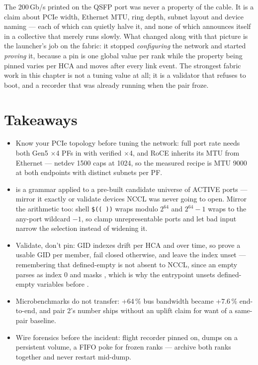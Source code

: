 The 200\,Gb/s printed on the QSFP port was never a property of the cable.
It is a claim about PCIe width, Ethernet MTU, ring depth, subnet layout and
device naming --- each of which can quietly halve it, and none of which
announces itself in a collective that merely runs slowly. What changed along
with that picture is the launcher's job on the fabric: it stopped
\emph{configuring} the network and started \emph{proving} it, because a pin
is one global value per rank while the property being pinned varies per HCA
and moves after every link event. The strongest fabric work in this chapter
is not a tuning value at all; it is a validator that refuses to boot, and a
recorder that was already running when the pair froze.

\FloatBarrier
\section*{Takeaways}
\begin{itemize}
  \item Know your PCIe topology before tuning the network: full port rate
        needs both Gen5 $\times$4 PFs in  with
         verified $\times$4, and RoCE inherits its
        MTU from Ethernet --- netdev 1500 caps  at 1024, so
        the measured recipe is MTU 9000 at both endpoints with distinct
        subnets per PF.
  \item {} is a grammar applied to a pre-built candidate
        universe of ACTIVE ports --- mirror it exactly or validate devices
        NCCL was never going to open. Mirror the arithmetic too: shell
        \texttt{\$(( ))} wraps modulo $2^{64}$ and $2^{64}{-}1$ wraps to the
        any-port wildcard $-1$, so clamp unrepresentable ports and let bad
        input narrow the selection instead of widening it.
  \item Validate, don't pin: GID indexes drift per HCA and over time, so
        prove a usable GID per member, fail closed otherwise, and leave the
        index unset --- remembering that defined-empty is not absent to
        NCCL, since an empty  parses as index 0
        and masks , which is why the entrypoint
        unsets defined-empty variables before .
  \item Microbenchmarks do not transfer: +64\,\%  bus
        bandwidth became +7.6\,\% end-to-end, and pair 2's number ships
        without an uplift claim for want of a same-pair baseline.
  \item Wire forensics before the incident: flight recorder pinned on,
        dumps on a persistent volume, a FIFO poke for frozen ranks ---
        archive both ranks together and never restart mid-dump.
\end{itemize}

